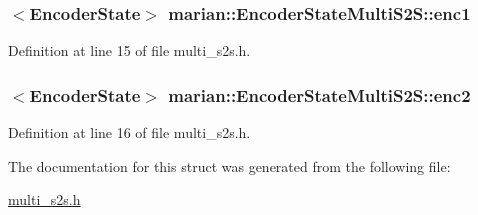 \subsubsection[{\texorpdfstring{enc1}{enc1}}]{$<${\bf Encoder\+State}$>$ marian\+::\+Encoder\+State\+Multi\+S2\+S\+::enc1}\hypertarget{structmarian_1_1EncoderStateMultiS2S_a3c2b80012a02a8f306950a7dcd40a145}{}\label{structmarian_1_1EncoderStateMultiS2S_a3c2b80012a02a8f306950a7dcd40a145}


Definition at line 15 of file multi\+\_\+s2s.\+h.

\subsubsection[{\texorpdfstring{enc2}{enc2}}]{$<${\bf Encoder\+State}$>$ marian\+::\+Encoder\+State\+Multi\+S2\+S\+::enc2}\hypertarget{structmarian_1_1EncoderStateMultiS2S_aca65075e1fc8e73943a414af6ea63ee3}{}\label{structmarian_1_1EncoderStateMultiS2S_aca65075e1fc8e73943a414af6ea63ee3}


Definition at line 16 of file multi\+\_\+s2s.\+h.



The documentation for this struct was generated from the following file\+:\begin{DoxyCompactItemize}
\item 
\hyperlink{multi__s2s_8h}{multi\+\_\+s2s.\+h}\end{DoxyCompactItemize}
